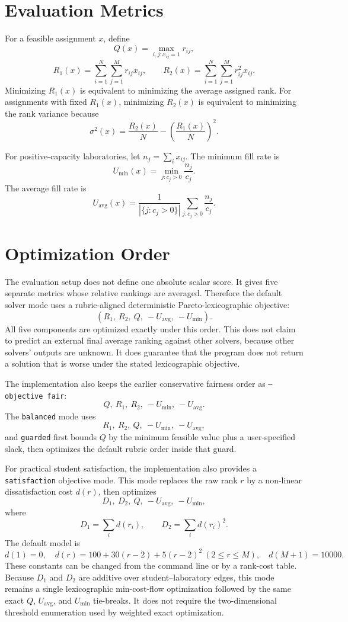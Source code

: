 \documentclass[11pt,a4paper]{article}
\begin{document}
\section{Evaluation Metrics}

For a feasible assignment \(x\), define
\[
  Q(x)=\max_{i,j:x_{ij}=1} r_{ij},
\]
\[
  R_1(x)=\sum_{i=1}^{N}\sum_{j=1}^{M} r_{ij}x_{ij},
  \qquad
  R_2(x)=\sum_{i=1}^{N}\sum_{j=1}^{M} r_{ij}^2x_{ij}.
\]
Minimizing \(R_1(x)\) is equivalent to minimizing the average assigned rank.
For assignments with fixed \(R_1(x)\), minimizing \(R_2(x)\) is equivalent to
minimizing the rank variance because
\[
  \sigma^2(x)
  =\frac{R_2(x)}{N}
  -\left(\frac{R_1(x)}{N}\right)^2.
\]

For positive-capacity laboratories, let \(n_j=\sum_i x_{ij}\).  The minimum
fill rate is
\[
  U_{\min}(x)=\min_{j:c_j>0}\frac{n_j}{c_j}.
\]
The average fill rate is
\[
  U_{\mathrm{avg}}(x)
  = \frac{1}{|\{j:c_j>0\}|}\sum_{j:c_j>0}\frac{n_j}{c_j}.
\]

\section{Optimization Order}

The evaluation setup does not define one absolute scalar score.  It gives
five separate metrics whose relative rankings are averaged.  Therefore the
default solver mode uses a rubric-aligned deterministic Pareto-lexicographic
objective:
\[
  \left(
    R_1,\ R_2,\ Q,\ -U_{\mathrm{avg}},\ -U_{\min}
  \right).
\]
All five components are optimized exactly under this order.  This does not
claim to predict an external final average ranking against other solvers,
because other solvers' outputs are unknown.  It does guarantee that the program
does not return a solution that is worse under the stated lexicographic
objective.

The implementation also keeps the earlier conservative fairness order as
\texttt{--objective fair}:
\[
  Q,\ R_1,\ R_2,\ -U_{\min},\ -U_{\mathrm{avg}}.
\]
The \texttt{balanced} mode uses
\[
  R_1,\ R_2,\ Q,\ -U_{\min},\ -U_{\mathrm{avg}},
\]
and \texttt{guarded} first bounds \(Q\) by the minimum feasible value plus a
user-specified slack, then optimizes the default rubric order inside that
guard.

For practical student satisfaction, the implementation also provides a
\texttt{satisfaction} objective mode.  This mode replaces the raw rank \(r\)
by a non-linear dissatisfaction cost \(d(r)\), then optimizes
\[
  D_1,\ D_2,\ Q,\ -U_{\mathrm{avg}},\ -U_{\min},
\]
where
\[
  D_1=\sum_i d(r_i), \qquad D_2=\sum_i d(r_i)^2.
\]
The default model is
\[
  d(1)=0,\quad
  d(r)=100+30(r-2)+5(r-2)^2\ (2\le r\le M),\quad
  d(M+1)=10000.
\]
These constants can be changed from the command line or by a rank-cost table.
Because \(D_1\) and \(D_2\) are additive over student--laboratory edges, this
mode remains a single lexicographic min-cost-flow optimization followed by the
same exact \(Q\), \(U_{\mathrm{avg}}\), and \(U_{\min}\) tie-breaks.  It does
not require the two-dimensional threshold enumeration used by weighted exact
optimization.
\end{document}
